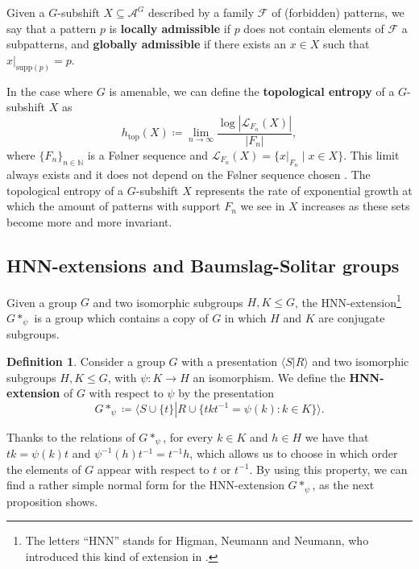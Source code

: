 \documentclass{aims}
\def\htop{h_{\mathrm{top}}}
\theoremstyle{definition}
\newtheorem{definition}[theorem]{Definition}
\begin{document}
Given a $G$-subshift $X\subseteq \mathcal{A}^G$ described by a family $\mathcal{F}$ of (forbidden) patterns, we say that a pattern $p$ is \textbf{locally admissible} if $p$ does not contain elements of $\mathcal{F}$ a subpatterns, and \textbf{globally admissible} if there exists an $x\in X$ such that $x|_{\mathrm{supp}(p)}=p$.


In the case where $G$ is amenable, we can define the \textbf{topological entropy} of a $G$-subshift $X$ as
$$
\htop(X)\coloneqq \lim_{n\to \infty}\frac{\log|\mathcal{L}_{F_n}(X)|}{|F_n|},
$$
where $\{F_n\}_{n\in \mathbb{N}}$ is a F\o lner sequence and $\mathcal{L}_{F_n}(X)=\{x|_{F_n}\mid x\in X\}$. This limit always exists and it does not depend on the F\o lner sequence chosen \cite[Theorem~4.38]{Kerr2016}. The topological entropy of a $G$-subshift $X$ represents the rate of exponential growth at which the amount of patterns with support $F_n$ we see in $X$ increases as these sets become more and more invariant.


\subsection{HNN-extensions and Baumslag-Solitar groups}
Given a group $G$ and two isomorphic subgroups $H,K\le G$, the HNN-extension\footnote{The letters ``HNN'' stands for Higman, Neumann and Neumann, who introduced this kind of extension in \cite{HNN49}.} $G*_{\psi}$ is a group which contains a copy of $G$ in which $H$ and $K$ are conjugate subgroups.

\begin{definition}\label{definition.hnn_extension} Consider a group $G$ with a presentation $\langle S\left|\right. R\rangle$ and two isomorphic subgroups $H,K\le G$, with $\psi:K\to H$ an isomorphism. We define the \textbf{HNN-extension} of $G$ with respect to $\psi$ by the presentation
	$$
	G*_{\psi}\coloneqq \langle S\cup\{t\} \left|\right. R\cup \{t k t^{-1}=\psi(k): k\in K \} \rangle.
	$$
\end{definition}
Thanks to the relations of $G*_{\psi}$, for every $k\in K$ and $h\in H$ we have that $tk=\psi(k)t$ and $\psi^{-1}(h)t^{-1}=t^{-1}h$, which allows us to choose in which order the elements of $G$ appear with respect to $t$ or $t^{-1}$. By using this property, we can find a rather simple normal form for the HNN-extension $G*_{\psi}$, as the next proposition shows.
\end{document}
